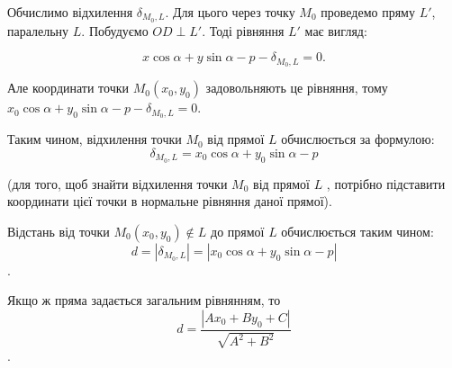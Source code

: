 Обчислимо відхилення $\delta_{M_0,L}$. Для цього через точку $M_0$ проведемо пряму $L'$,
паралельну $L$. Побудуємо $OD \perp L'$. Тоді рівняння $L'$ має вигляд:

$$x\cos\alpha + y\sin\alpha - p - \delta_{M_0,L} = 0.$$

Але координати точки $M_0(x_0,y_0)$ задовольняють це рівняння, тому
$x_0\cos\alpha + y_0\sin\alpha - p - \delta_{M_0,L} = 0$.

Таким чином, відхилення точки $M_0$ від прямої $L$ обчислюється за формулою:
$$\delta_{M_0,L} = x_0\cos\alpha + y_0\sin\alpha - p$$

(для того, щоб знайти відхилення точки $M_0$ від прямої $L$ , потрібно підставити
координати цієї точки в нормальне рівняння даної прямої).

Відстань від точки $M_0(x_0,y_0) \not\in L$ до прямої $L$ обчислюється таким чином:
$$d = |\delta_{M_0,L}| = |x_0\cos\alpha + y_0\sin\alpha - p|$$.

Якщо ж пряма задається загальним рівнянням, то 
$$d = \dfrac{|Ax_0 + By_0 + C|}{\sqrt{A^2 + B^2}}$$.

